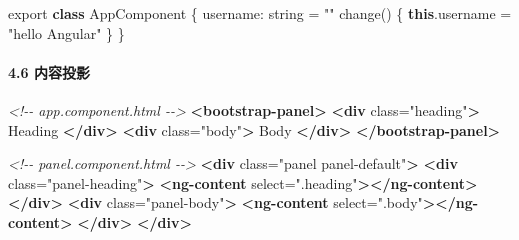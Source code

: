 \documentclass[
]{article}
\newenvironment{Shaded}{}{}
\newcommand{\AttributeTok}[1]{\textcolor[rgb]{0.49,0.56,0.16}{#1}}
\newcommand{\CommentTok}[1]{\textcolor[rgb]{0.38,0.63,0.69}{\textit{#1}}}
\newcommand{\DataTypeTok}[1]{\textcolor[rgb]{0.56,0.13,0.00}{#1}}
\newcommand{\FunctionTok}[1]{\textcolor[rgb]{0.02,0.16,0.49}{#1}}
\newcommand{\ImportTok}[1]{#1}
\newcommand{\KeywordTok}[1]{\textcolor[rgb]{0.00,0.44,0.13}{\textbf{#1}}}
\newcommand{\NormalTok}[1]{#1}
\newcommand{\OperatorTok}[1]{\textcolor[rgb]{0.40,0.40,0.40}{#1}}
\newcommand{\OtherTok}[1]{\textcolor[rgb]{0.00,0.44,0.13}{#1}}
\newcommand{\StringTok}[1]{\textcolor[rgb]{0.25,0.44,0.63}{#1}}
\begin{document}
\begin{Shaded}
\begin{Highlighting}[]
\ImportTok{export} \KeywordTok{class}\NormalTok{ AppComponent \{}
  \DataTypeTok{username}\OperatorTok{:}\NormalTok{ string }\OperatorTok{=} \StringTok{""}
  \FunctionTok{change}\NormalTok{() \{}
    \KeywordTok{this}\OperatorTok{.}\AttributeTok{username} \OperatorTok{=} \StringTok{"hello Angular"}
\NormalTok{  \}}
\NormalTok{\}}
\end{Highlighting}
\end{Shaded}

\hypertarget{46-ux5185ux5bb9ux6295ux5f71}{%
\paragraph{4.6 内容投影}\label{46-ux5185ux5bb9ux6295ux5f71}}

\begin{Shaded}
\begin{Highlighting}[]
\CommentTok{\textless{}!{-}{-} app.component.html {-}{-}\textgreater{}}
\KeywordTok{\textless{}bootstrap{-}panel\textgreater{}}
	\KeywordTok{\textless{}div}\OtherTok{ class=}\StringTok{"heading"}\KeywordTok{\textgreater{}}
\NormalTok{        Heading}
  \KeywordTok{\textless{}/div\textgreater{}}
  \KeywordTok{\textless{}div}\OtherTok{ class=}\StringTok{"body"}\KeywordTok{\textgreater{}}
\NormalTok{        Body}
  \KeywordTok{\textless{}/div\textgreater{}}
\KeywordTok{\textless{}/bootstrap{-}panel\textgreater{}}
\end{Highlighting}
\end{Shaded}

\begin{Shaded}
\begin{Highlighting}[]
\CommentTok{\textless{}!{-}{-} panel.component.html {-}{-}\textgreater{}}
\KeywordTok{\textless{}div}\OtherTok{ class=}\StringTok{"panel panel{-}default"}\KeywordTok{\textgreater{}}
  \KeywordTok{\textless{}div}\OtherTok{ class=}\StringTok{"panel{-}heading"}\KeywordTok{\textgreater{}}
    \KeywordTok{\textless{}ng{-}content}\OtherTok{ select=}\StringTok{".heading"}\KeywordTok{\textgreater{}\textless{}/ng{-}content\textgreater{}}
  \KeywordTok{\textless{}/div\textgreater{}}
  \KeywordTok{\textless{}div}\OtherTok{ class=}\StringTok{"panel{-}body"}\KeywordTok{\textgreater{}}
    \KeywordTok{\textless{}ng{-}content}\OtherTok{ select=}\StringTok{".body"}\KeywordTok{\textgreater{}\textless{}/ng{-}content\textgreater{}}
  \KeywordTok{\textless{}/div\textgreater{}}
\KeywordTok{\textless{}/div\textgreater{}}
\end{Highlighting}
\end{Shaded}
\end{document}
